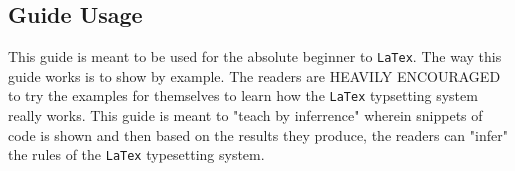 \documentclass[a4paper, 12pt]{report}
\begin{document}
\begin{center}
\subsection{Guide Usage}
\begin{comment}
\end{comment}
This guide is meant to be used for the absolute beginner to \texttt{LaTex}. The way this guide works is to show by example. The readers are HEAVILY ENCOURAGED to try the examples for themselves to learn how the \texttt{LaTex} typsetting system really works. This guide is meant to "teach by inferrence" wherein snippets of code is shown and then based on the results they produce, the readers can "infer" the rules of the \texttt{LaTex} typesetting system.


\end{center}
\end{document}
